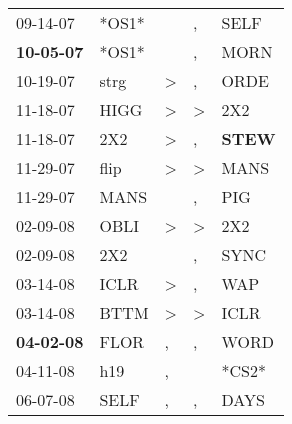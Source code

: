 \begin{supertabular}{p{0.07\textwidth}p{0.06\textwidth}p{0.02\textwidth}p{0.02\textwidth}p{0.06\textwidth}}
          09-14-07\textsuperscript{} &                            *OS1* &                  &                , &           SELF\textsuperscript{} \\
 \textbf{10-05-07\textsuperscript{}} &                            *OS1* &                  &                , &           MORN\textsuperscript{} \\
          10-19-07\textsuperscript{} &           strg\textsuperscript{} &     \textgreater &                , &           ORDE\textsuperscript{} \\
          11-18-07\textsuperscript{} &           HIGG\textsuperscript{} &     \textgreater &     \textgreater &            2X2\textsuperscript{} \\
          11-18-07\textsuperscript{} &            2X2\textsuperscript{} &     \textgreater &                , &  \textbf{STEW\textsuperscript{}} \\
          11-29-07\textsuperscript{} &           flip\textsuperscript{} &     \textgreater &     \textgreater &           MANS\textsuperscript{} \\
          11-29-07\textsuperscript{} &           MANS\textsuperscript{} &                  &                , &            PIG\textsuperscript{} \\
          02-09-08\textsuperscript{} &           OBLI\textsuperscript{} &     \textgreater &     \textgreater &            2X2\textsuperscript{} \\
          02-09-08\textsuperscript{} &            2X2\textsuperscript{} &                  &                , &           SYNC\textsuperscript{} \\
          03-14-08\textsuperscript{} &           ICLR\textsuperscript{} &     \textgreater &                , &            WAP\textsuperscript{} \\
          03-14-08\textsuperscript{} &           BTTM\textsuperscript{} &     \textgreater &     \textgreater &           ICLR\textsuperscript{} \\
 \textbf{04-02-08\textsuperscript{}} &           FLOR\textsuperscript{} &                , &                , &           WORD\textsuperscript{} \\
          04-11-08\textsuperscript{} &            h19\textsuperscript{} &                , &                  &                            *CS2* \\
          06-07-08\textsuperscript{} &           SELF\textsuperscript{} &                , &                , &           DAYS\textsuperscript{} \\

\end{supertabular}
